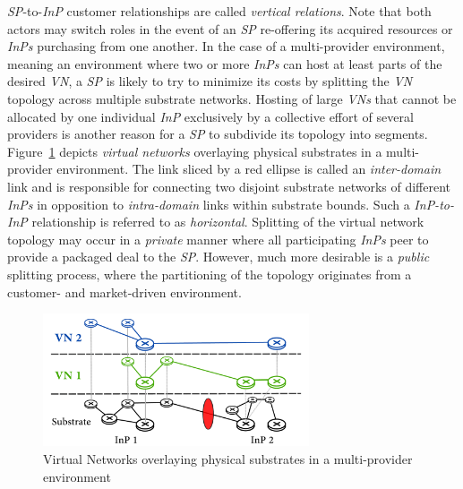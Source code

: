 \documentclass[prodmode,acmtomccap]{acmlarge}
\begin{document}
\emph{SP}-to-\emph{InP} customer relationships are called \emph{vertical relations}. Note that both actors may switch roles in the event of an 
\emph{SP} re-offering its acquired resources or \emph{InPs} purchasing from one another.
 In the case of a multi-provider environment, meaning an environment where two or more
\emph{InPs} can host at least parts of the desired \emph{VN}, a \emph{SP} is likely to try to minimize its costs by splitting the \emph{VN} topology across multiple substrate networks.
Hosting of large \emph{VNs} that cannot be allocated by one individual \emph{InP} exclusively by a collective effort of several providers is another reason for a \emph{SP}
to subdivide its topology into segments. Figure~\ref{fig1} depicts \emph{virtual networks} overlaying physical substrates in a multi-provider environment.
The link sliced by a red ellipse is called an \emph{inter-domain} link and is responsible for connecting two disjoint substrate networks of different \emph{InPs} in opposition to 
\emph{intra-domain} links within substrate bounds. Such a \emph{InP-to-InP} relationship is referred to as \emph{horizontal}. 
Splitting of the virtual network topology may occur in a \emph{private} manner where all participating \emph{InPs} peer
to provide a packaged deal to the \emph{SP}. However, much more desirable is a \emph{public} splitting process, where the partitioning of the topology originates from a customer- and
market-driven environment.

\begin{figure}[htb]
	\centering
	\includegraphics[width=0.7\textwidth]{virtualnetworks}
	\caption{Virtual Networks overlaying physical substrates in a multi-provider environment}
	\label{fig1}
\end{figure}
\end{document}
